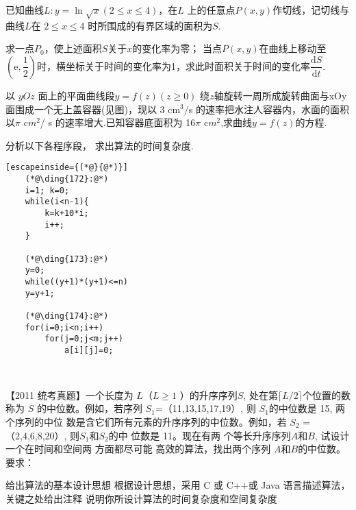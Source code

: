 \documentclass[standard]{ExBook}
\begin{document}
\begin{qitems}
    
    \begin{bbox}
        \qitem  已知曲线$L:y=\ln\sqrt{x}(2\leqslant x\leqslant4)$，在$L$ 上的任意点$P(x,y)$作切线，记切线与曲线$L$在 $2\leqslant x\leqslant4$
        时所围成的有界区域的面积为$S$.
        \begin{subqitems}
            \subqitem 求一点$P_0$，使上述面积$S$关于$x$的变化率为零；
            \subqitem 当点$P(x,y)$在曲线上移动至$(\mathrm{e},\dfrac{1}{2})$时，横坐标关于时间的变化率为1，求此时面积关于时间的变化率$\dfrac{\mathrm{d}S}{\mathrm{d}t}.$
        \end{subqitems}
    \end{bbox}

    \begin{bbox}
        \qitem 以 $yOz$ 面上的平面曲线段$y=f(z)(z\geqslant0)$ 绕$z$轴旋转一周所成旋转曲面与xOy 面围成一个无上盖容器(见图)，现以 3 cm$^3/$s 的速率把水注人容器内，水面的面积以$\pi$ c$m^2$/ s 的速率增大.已知容器底面积为 16$\pi$ c$m^2$,求曲线$y=f(z)$的方程.
    \end{bbox}

    \begin{bbox}
        \qitem   分析以下各程序段， 求出算法的时间复杂度.
        \begin{lstlisting}[escapeinside={(*@}{@*)}]
    (*@\ding{172}:@*)
    i=1; k=0;
    while(i<n-1){
        k=k+10*i;
        i++;
    }

    (*@\ding{173}:@*)
    y=0;
    while((y+1)*(y+1)<=n)
    y=y+1;

    (*@\ding{174}:@*)
    for(i=0;i<n;i++)
        for(j=0;j<m;j++)
            a[i][j]=0;
    
        
        \end{lstlisting}
    \end{bbox}

    \begin{bbox}
        \qitem   【2011 统考真题】一个长度为 $L$（$L\geqslant 1$ ）的升序序列$ S$, 处在第$\lceil L/2\rceil $个位置的数称为 $S$
        的中位数。例如，若序列 $S_1$=（11,13,15,17,19）, 则 $S_1$的中位数是 15, 两 个序列的中位
        数是含它们所有元素的升序序列的中位数。例如，若 $S_2$ =（2,4,6,8,20）, 则$S_1$和$S_2$的中
        位数是 11。现在有两 个等长升序序列$A$和$B$, 试设计一个在时间和空间两 方面都尽可能
        高效的算法，找出两个序列 $A$和$B$的中位数。要求：
        \begin{subqitems}
            \subqitem 给出算法的基本设计思想
            \subqitem  根据设计思想，采用 C 或 C++或 Java 语言描述算法，关键之处给出注释
            \subqitem 说明你所设计算法的时间复杂度和空间复杂度
        \end{subqitems}
    \end{bbox}

\end{qitems}
\end{document}
